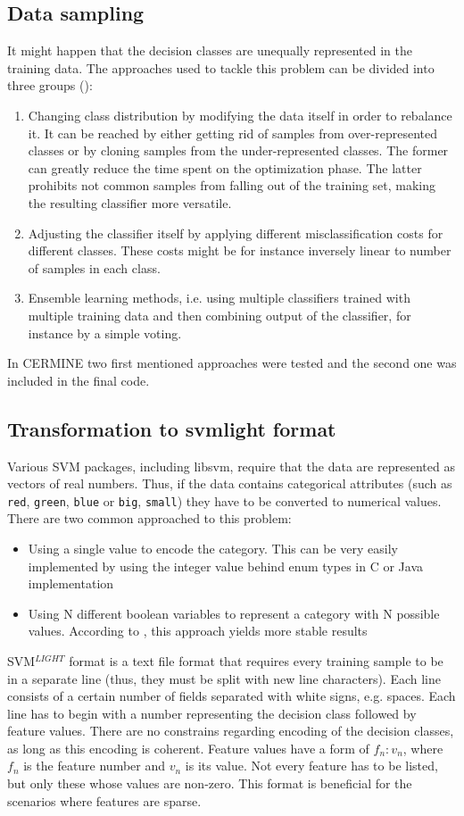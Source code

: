 \subsection{Data sampling}
It might happen that the decision classes are unequally represented in the training data. The approaches used to tackle this problem can be divided into three groups (\cite{Choi}):
\begin{enumerate}
\item Changing class distribution by modifying the data itself in order to rebalance it. It can be reached by either getting rid of samples from over-represented classes or by cloning samples from the under-represented classes. The former can greatly reduce the time spent on the optimization phase. The latter prohibits not common samples from falling out of the training set, making the resulting classifier more versatile.
\item Adjusting the classifier itself by applying different misclassification costs for different classes. These costs might be for instance inversely linear to number of samples in each class.
\item Ensemble learning methods, i.e. using multiple classifiers trained with multiple training data and then combining output of the classifier, for instance by a simple voting.
\end{enumerate}
In CERMINE two first mentioned approaches were tested and the second one was included in the final code.
\\
\subsection{Transformation to svmlight format}
Various SVM packages, including libsvm, require that the data are represented as vectors of real numbers. Thus, if the data contains categorical attributes (such as \verb+red+, \verb+green+, \verb+blue+ or \verb+big+, \verb+small+) they have to be converted to numerical values. There are two common approached to this problem:
\begin{itemize}
\item Using a single value to encode the category. This can be very easily implemented by using the integer value behind enum types in C or Java implementation
\item Using N different boolean variables to represent a category with N possible values. According to \cite{Chih-WeiHsu2010}, this approach yields more stable results
\end{itemize}
\qquad
SVM$^{LIGHT}$ format is a text file format that requires every training sample to be in a separate line (thus, they must be split with new line characters). Each line consists of a certain number of fields separated with white signs, e.g. spaces. Each line has to begin with a number representing the decision class followed by feature values. There are no constrains regarding encoding of the decision classes, as long as this encoding is coherent. Feature values have a form of $f_n:v_n$, where $f_n$ is the feature number and $v_n$ is its value. Not every feature has to be listed, but only these whose values are non-zero. This format is beneficial for the scenarios where features are sparse.

